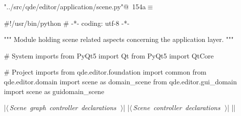 \documentclass[%
    a4paper,    %
    justified,  %
    nobib,      %
    openany     %
]{tufte-book}
\begin{document}
\begin{flushleft} \small
\begin{minipage}{\linewidth}\label{scrap173}\raggedright\small
{} \verb@"../src/qde/editor/application/scene.py"@\nobreak\ {\footnotesize {154a}}$\equiv$
\vspace{-1ex}
\begin{pythoncode}
#!/usr/bin/python
# -*- coding: utf-8 -*-

""" Module holding scene related aspects concerning the application layer.
"""

# System imports
from PyQt5 import Qt
from PyQt5 import QtCore

# Project imports
from qde.editor.foundation import common
from qde.editor.domain     import scene as domain_scene
from qde.editor.gui_domain import scene as guidomain_scene

|\hbox{$\langle\,${\itshape Scene graph controller declarations}\nobreak\ {\footnotesize {}}$\,\rangle$}|
|\hbox{$\langle\,${\itshape Scene controller declarations}\nobreak\ {\footnotesize {}}$\,\rangle$}|
|\NWsep|
\end{pythoncode}
\vspace{1.5ex}
\footnotesize
\begin{list}{}{\setlength{\itemsep}{-\parsep}\setlength{\itemindent}{-\leftmargin}}

\item{}
\end{list}
\end{minipage}\vspace{4ex}
\end{flushleft}
\end{document}
